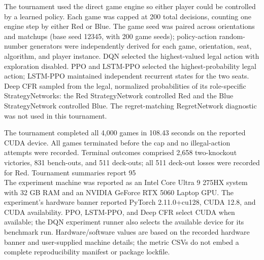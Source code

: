 \documentclass[11pt]{article}
\begin{document}
The tournament used the direct game engine so either player could be controlled by a learned policy. Each game was capped at 200 total decisions, counting one engine step by either Red or Blue. The game seed was paired across orientations and matchups (base seed 12345, with 200 game seeds); policy-action random-number generators were independently derived for each game, orientation, seat, algorithm, and player instance. DQN selected the highest-valued legal action with exploration disabled. PPO and LSTM-PPO selected the highest-probability legal action; LSTM-PPO maintained independent recurrent states for the two seats. Deep CFR sampled from the legal, normalized probabilities of its role-specific StrategyNetworks: the Red StrategyNetwork controlled Red and the Blue StrategyNetwork controlled Blue. The regret-matching RegretNetwork diagnostic was not used in this tournament.

The tournament completed all 4,000 games in 108.43 seconds on the reported CUDA device. All games terminated before the cap and no illegal-action attempts were recorded. Terminal outcomes comprised 2,658 two-knockout victories, 831 bench-outs, and 511 deck-outs; all 511 deck-out losses were recorded for Red. Tournament summaries report 95\\%

The experiment machine was reported as an Intel Core Ultra 9 275HX system with 32 GB RAM and an NVIDIA GeForce RTX 5060 Laptop GPU. The experiment's hardware banner reported PyTorch 2.11.0+cu128, CUDA 12.8, and CUDA availability. PPO, LSTM-PPO, and Deep CFR select CUDA when available; the DQN experiment runner also selects the available device for its benchmark run. Hardware/software values are based on the recorded hardware banner and user-supplied machine details; the metric CSVs do not embed a complete reproducibility manifest or package lockfile.
\end{document}
